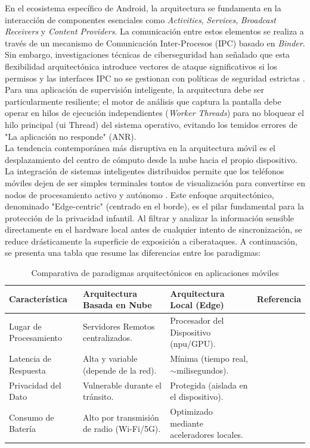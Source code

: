 En el ecosistema específico de Android, la arquitectura se fundamenta en la interacción de componentes esenciales como \textit{Activities}, \textit{Services}, \textit{Broadcast Receivers} y \textit{Content Providers}. La comunicación entre estos elementos se realiza a través de un mecanismo de Comunicación Inter-Procesos (IPC) basado en \textit{Binder}. Sin embargo, investigaciones técnicas de ciberseguridad han señalado que esta flexibilidad arquitectónica introduce vectores de ataque significativos si los permisos y las interfaces IPC no se gestionan con políticas de seguridad estrictas \cite{rojas_technical_2025, nguyen_security_2021}. Para una aplicación de supervisión inteligente, la arquitectura debe ser particularmente resiliente; el motor de análisis que captura la pantalla debe operar en hilos de ejecución independientes (\textit{Worker Threads}) para no bloquear el hilo principal (\gls{ui} Thread) del sistema operativo, evitando los temidos errores de "La aplicación no responde" (ANR).\\

La tendencia contemporánea más disruptiva en la arquitectura móvil es el desplazamiento del centro de cómputo desde la nube hacia el propio dispositivo. La integración de sistemas inteligentes distribuidos permite que los teléfonos móviles dejen de ser simples terminales tontos de visualización para convertirse en nodos de procesamiento activo y autónomo \cite{oladimeji_smart_2023}. Este enfoque arquitectónico, denominado "Edge-centric" (centrado en el borde), es el pilar fundamental para la protección de la privacidad infantil. Al filtrar y analizar la información sensible directamente en el hardware local antes de cualquier intento de sincronización, se reduce drásticamente la superficie de exposición a ciberataques. A continuación, se presenta una tabla que resume las diferencias entre los paradigmas:\\

\begin{table}[h!]
\centering
\caption{Comparativa de paradigmas arquitectónicos en aplicaciones móviles}
\begin{tabular}{|p{3.5cm}|p{4.5cm}|p{4.5cm}|p{2cm}|}
\hline
\textbf{Característica} & \textbf{Arquitectura Basada en Nube} & \textbf{Arquitectura Local (Edge)} & \textbf{Referencia} \\ \hline
Lugar de Procesamiento & Servidores Remotos centralizados. & Procesador del Dispositivo (\gls{npu}/GPU). & \cite{oladimeji_smart_2023} \\ \hline
Latencia de Respuesta & Alta y variable (depende de la red). & Mínima (tiempo real, $\sim$milisegundos). & \cite{koulaxidis_improving_2022} \\ \hline
Privacidad del Dato & Vulnerable durante el tránsito. & Protegida (aislada en el dispositivo). & \cite{feal_angel_2020} \\ \hline
Consumo de Batería & Alto por transmisión de radio (Wi-Fi/5G). & Optimizado mediante aceleradores locales. & \cite{ali_efficient_2021} \\ \hline
\end{tabular}
\end{table}

